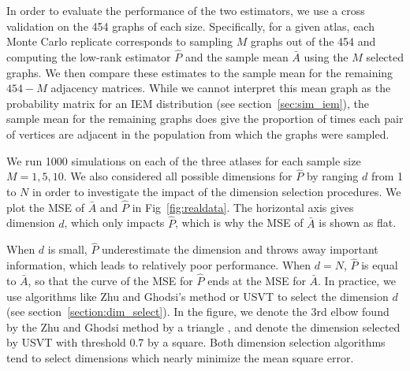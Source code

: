 \documentclass[10pt,letterpaper]{article}
\begin{document}
In order to evaluate the performance of the two estimators, we use a cross validation on the 454 graphs of each size. 
Specifically, for a given atlas, each Monte Carlo replicate corresponds to sampling $M$ graphs out of the 454 and computing the low-rank estimator $\hat{P}$ and the sample mean $\bar{A}$ using the $M$ selected graphs. 
We then compare these estimates to the sample mean for the remaining $454-M$ adjacency matrices.
While we cannot interpret this mean graph as the probability matrix for an IEM distribution (see section~\ref{sec:sim_iem}), the sample mean for the remaining graphs does give the proportion of times each pair of vertices are adjacent in the population from which the graphs were sampled.


We run 1000 simulations on each of the three atlases for each sample size $M=1,5,10$.
We also considered all possible dimensions for $\hat{P}$ by ranging $d$ from 1 to $N$ in order to investigate the impact of the dimension selection procedures.
We plot the MSE of $\bar{A}$ and $\hat{P}$ in Fig~\ref{fig:realdata}.
The horizontal axis gives dimension $d$, which only impacts $\hat{P}$, which is why the MSE of $\bar{A}$ is shown as flat.

When $d$ is small, $\hat{P}$ underestimate the dimension and throws away important information, which leads to relatively poor performance. When $d=N$, $\hat{P}$ is equal to $\bar{A}$, so that the curve of the MSE for $\hat{P}$ ends at the MSE for $\bar{A}$. 
In practice, we use algorithms like Zhu and Ghodsi's method or USVT to select the dimension $d$ (see section~\ref{section:dim_select}). 
In the figure, we denote the 3rd elbow found by the Zhu and Ghodsi method by a triangle , and denote the dimension selected by USVT with threshold 0.7 by a square. 
Both dimension selection algorithms tend to select dimensions which nearly minimize the mean square error.
\end{document}
